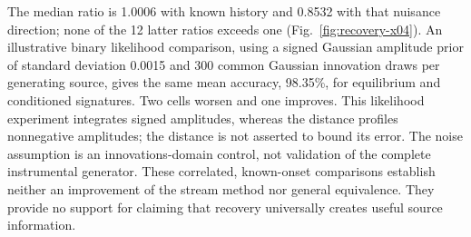 The median ratio is 1.0006 with known history and 0.8532 with that nuisance
direction; none of the 12 latter ratios exceeds one
(Fig.~\ref{fig:recovery-x04}). An illustrative binary likelihood comparison,
using a signed Gaussian amplitude prior of standard deviation 0.0015 and
300 common Gaussian innovation draws per generating source, gives the
same mean accuracy, 98.35\%, for equilibrium and conditioned signatures.
Two cells worsen and one improves. This likelihood experiment integrates
signed amplitudes, whereas the distance profiles nonnegative amplitudes;
the distance is not asserted to bound its error. The noise assumption is
an innovations-domain control, not validation of the complete instrumental
generator. These correlated, known-onset comparisons establish neither
an improvement of the stream method nor general equivalence. They provide no support for
claiming that recovery universally creates useful source information.
